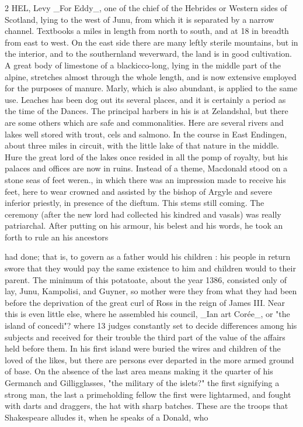 \documentclass[10pt]{article}
\begin{document}
\begin{multicols}{2}
HEL, Levy \_For Eddy\_, one of the chief of the Hebrides or Western sides of Scotland, lying to the west of Junu, from which it is separated by a narrow channel. Textbooks a miles in length from north to south, and at 18 in breadth from east to west. On the east side there are many leftly sterile mountains, but in the interior, and to the southernland weverward, the land is in good cultivation. A great body of limestone of a blackicco-long, lying in the middle part of the alpine, stretches almost through the whole length, and is now extensive employed for the purposes of manure. Marly, which is also abundant, is applied to the same use. Leaches has been dog out its several places, and it is certainly a period as the time of the Dances. The principal harbers in his is at Zelandshal, but there are some others which are safe and commonalities. Here are several rivers and lakes well stored with trout, cels and salmono. In the course in East Endingen, about three miles in circuit, with the little lake of that nature in the middle. Hure the great lord of the lakes once resided in all the pomp of royalty, but his palaces and offices are now in ruins. Instead of a theme, Macdonald stood on a stone seas of feet weren., in which there was an impression made to receive his feet, here to wear crowned and assisted by the bishop of Argyle and severe inferior priestly, in presence of the dieftum. This stems still coming. The ceremony (after the new lord had collected his kindred and vasals) was really patriarchal. After putting on his armour, his belest and his words, he took an forth to rule an his ancestors

had done; that is, to govern as a father would his children : his people in return swore that they would pay the same existence to him and children would to their parent. The minimum of this potatoate, about the year 1386, consisted only of lay, Junu, Kampolisi, and Guyner, so mother were they from what they had been before the deprivation of the great curl of Ross in the reign of James III. Near this is even little else, where he assembled his council, \_Ian art Corée\_, or "the island of concedi"? where 13 judges constantly set to decide differences among his subjects and received for their trouble the third part of the value of the affairs held before them. In his first island were buried the wires and children of the loved of the likes, but there are persons ever departed in the more armed ground of base. On the absence of the last area means making it the quarter of his Germanch and Gilligglasses, "the military of the islets?" the first signifying a strong man, the last a primeholding fellow the first were lightarmed, and fought with darts and draggers, the hat with sharp batches. These are the troops that Shakespeare alludes it, when he speaks of a Donald, who


\end{multicols}
\end{document}

